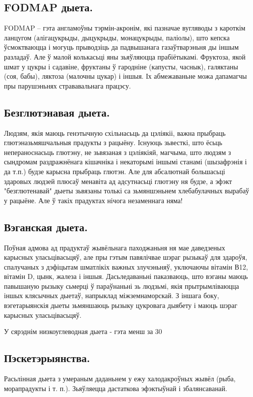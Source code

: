 \subsection{FODMAP дыета.}
FODMAP – гэта англамоўны тэрмін-акронім, які пазначае вугляводы з кароткім ланцугом (алігацукрыды, дыцукрыды, монацукрыды, паліолы), што кепска ўсмоктваюцца і могуць прыводзіць да падвышанага газаўтварэньня ды іншым разладаў. Але ў малой колькасьці яны зьяўляюцца прабіётыкамі. Фруктоза, якой шмат у цукры і садавіне, фруктаны ў гародніне (капусты, часнык), галяктаны (соя, бабы), ляктоза (малочны цукар) і іншыя. Іх абмежаваньне можа дапамагчы пры парушэньнях стрававальнага працэсу.

\subsection{Безглютэнавая дыета.}
Людзям, якія маюць генэтычную схільнасьць да цэліякіі, важна прыбраць глютэназьмяшчальныя прадукты з рацыёну. Існуюць зьвесткі, што ёсьць непераноснасьць глютэну, не зьвязаная з цэліякіяй, магчыма, што людзям з сындромам раздражнёнага кішачніка і некаторымі іншымі станамі (шызафрэнія і да т.п.) будзе карысна прыбраць глютэн. Але для абсалютнай большасьці здаровых людзей плюсаў менавіта ад адсутнасьці глютэну ня будзе, а эфэкт "безглютенавай" дыеты зьвязаны толькі са зьмяншэньнем хлебабулачных вырабаў у рацыёне. Але ў такіх прадуктах нічога незаменнага няма!

\subsection{Вэганская дыета.}
Поўная адмова ад прадуктаў жывёльнага паходжаньня ня мае даведзеных карысных уласьцівасьцяў, але пры гэтым павялічвае шэраг рызыкаў для здароўя, спалучаных з дэфіцытам шматлікіх важных злучэньняў, уключаючы вітамін В12, вітамін D, цынк, жалеза і іншыя. Дасьледаваньні паказваюць, што вэганы маюць павышаную рызыку сьмерці ў параўнаньні зь людзьмі, якія прытрымліваюцца іншых клясычных дыетаў, напрыклад міжземнаморскай. З іншага боку, вэгетарыянскія дыеты зьмяншаюць рызыку цукровага дыябету і маюць шэраг карысных уласьцівасьцяў.

У сярэднім низкоуглеводная дыета - гэта менш за 30%

\subsection{Пэскетэрыянства.}
Расьлінная дыета з умераным даданьнем у ежу халодакроўных жывёл (рыба, морапрадукты і т. п.). Зьяўляецца дастаткова эфэктыўнай і збалянсаванай.

